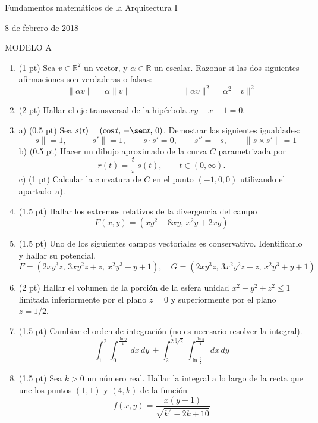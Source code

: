 \documentclass[a4paper, 12pt]{article}
\newcommand{\R}{\mathbb R}
\begin{document}
\pagestyle {empty}
\begin{center}
\LARGE
Fundamentos matemáticos de la Arquitectura I

\Large
8 de febrero de 2018

\end{center}



MODELO A
\vskip 6mm
\begin{enumerate}
\item (1 pt)
Sea $v\in \R^2$ un vector, y $\alpha\in\R$ un escalar. 
Razonar si las dos siguientes afirmaciones son verdaderas o falsas:
$$
\| \alpha v \| = \alpha \| v \| \qquad \qquad \qquad
\| \alpha v\|^2 = \alpha^2 \| v\|^2
$$
\vskip 6mm

\item (2 pt)
Hallar el eje transversal de la hipérbola $xy-x-1=0$.
\vskip 6mm

\item
a) (0.5 pt) Sea $s(t)=(\cos t,\, -\sen t,\, 0)$.
Demostrar las siguientes igualdades:
$$
\|s\|=1, \qquad
\|s'\|=1, \qquad
s\cdot s'=0, \qquad
s''=-s, \qquad
\|s\times s'\|=1
$$
b) (0.5 pt) Hacer un dibujo aproximado de la curva $C$ parametrizada por
$$
r(t)=\frac{t}\pi\, s(t),\qquad  t\in(0,\infty).
$$
c) (1 pt)
Calcular la curvatura de $C$ en el punto $(-1,0,0)$ utilizando el apartado~a).

\hrulefill

\item (1.5 pt)
Hallar los extremos relativos de la divergencia del campo
$$
F(x,y)=(xy^2-8xy,\, x^2y+2xy)
$$
\vskip 6mm

\item (1.5 pt)
Uno de los siguientes campos vectoriales es conservativo. Identificarlo y hallar su potencial.
$$
F=(2xy^3z,\, 3xy^2z+z,\, x^2y^3+y+1),
\quad
G=(2xy^3z,\, 3x^2y^2z+z,\, x^2y^3+y+1)
$$
\vskip 6mm

\item (2 pt)
Hallar el volumen de la porción de la esfera unidad
$x^2 + y^2 +z^2 \le 1$
limitada inferiormente por el plano $z = 0$
y superiormente por el plano $z = 1/2$.
\vskip 6mm

\item (1.5 pt)
Cambiar el orden de integración (no es necesario resolver la integral).
$$
\int_1^2 \int_0^\frac{\ln y}4\,dx\,dy\, +
\int_2^{2\sqrt[3]{2}}\int_{\ln \frac{y}2}^\frac{\ln y}4\,dx\,dy
$$
\vskip 6mm


\item (1.5 pt)
Sea $k>0$ un número real.
Hallar la integral a lo largo de la recta que une los puntos $(1,1)$ y $(4,k)$ de la función
$$
f(x,y)=\frac{x(y-1)}{\sqrt{k^2-2k+10}}
$$
\vskip 6mm


\end{enumerate}
\end{document}
